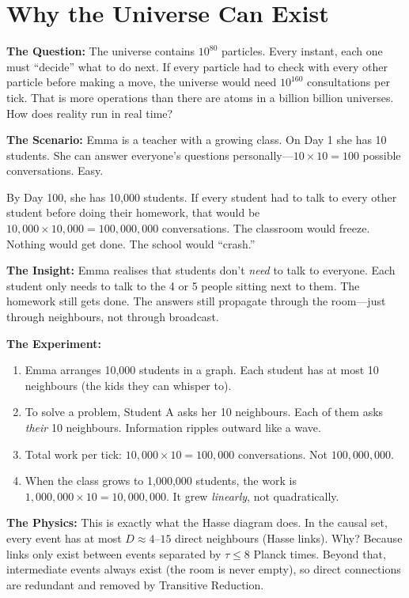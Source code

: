 \documentclass[11pt, a4paper, openany]{book}
\begin{document}
\section{Why the Universe Can Exist}
\begin{thoughtexp}
\textbf{The Question:} The universe contains $10^{80}$ particles. Every instant, each one must ``decide'' what to do next. If every particle had to check with every other particle before making a move, the universe would need $10^{160}$ consultations per tick. That is more operations than there are atoms in a billion billion universes. How does reality run in real time?

\textbf{The Scenario:} Emma is a teacher with a growing class. On Day 1 she has 10 students. She can answer everyone's questions personally---$10 \times 10 = 100$ possible conversations. Easy.

By Day 100, she has 10,000 students. If every student had to talk to every other student before doing their homework, that would be $10,000 \times 10,000 = 100{,}000{,}000$ conversations. The classroom would freeze. Nothing would get done. The school would ``crash.''

\textbf{The Insight:} Emma realises that students don't \emph{need} to talk to everyone. Each student only needs to talk to the 4 or 5 people sitting next to them. The homework still gets done. The answers still propagate through the room---just through neighbours, not through broadcast.

\textbf{The Experiment:}
\begin{enumerate}
  \item Emma arranges 10,000 students in a graph. Each student has at most 10 neighbours (the kids they can whisper to).
  \item To solve a problem, Student A asks her 10 neighbours. Each of them asks \emph{their} 10 neighbours. Information ripples outward like a wave.
  \item Total work per tick: $10{,}000 \times 10 = 100{,}000$ conversations. Not $100{,}000{,}000$.
  \item When the class grows to 1,000,000 students, the work is $1{,}000{,}000 \times 10 = 10{,}000{,}000$. It grew \emph{linearly}, not quadratically.
\end{enumerate}

\textbf{The Physics:} This is exactly what the Hasse diagram does. In the causal set, every event has at most $D \approx 4\text{--}15$ direct neighbours (Hasse links). Why? Because links only exist between events separated by $\tau \le 8$ Planck times. Beyond that, intermediate events always exist (the room is never empty), so direct connections are redundant and removed by Transitive Reduction.


\end{thoughtexp}
\end{document}

